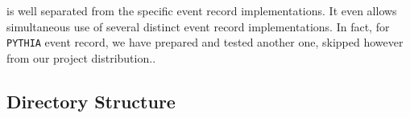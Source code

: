 \documentclass[]{Tauola_interface_design}
\begin{document}
\begin{itemize}
{       is well separated from the specific event record implementations.
       It even allows simultaneous use of several distinct event record implementations.
       In fact, for {\tt PYTHIA} event record, we have prepared and tested
       another one, 
       skipped however from our project distribution.}.
\end{itemize}

\subsection{Directory Structure}
\label{sec:directories}
\end{document}
